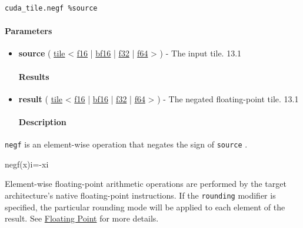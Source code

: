 \documentclass{article}
\begin{document}
\begin{lstlisting}
cuda_tile.negf %source
\end{lstlisting}

\paragraph{Parameters}

\begin{itemize}
\item \textbf{source} ( \href{https://docs.nvidia.com/cuda/tile-ir/latest/sections/types.html#type-tile}{tile} < \href{https://docs.nvidia.com/cuda/tile-ir/latest/sections/types.html#subsection-element-types}{f16} | \href{https://docs.nvidia.com/cuda/tile-ir/latest/sections/types.html#subsection-element-types}{bf16} | \href{https://docs.nvidia.com/cuda/tile-ir/latest/sections/types.html#subsection-element-types}{f32} | \href{https://docs.nvidia.com/cuda/tile-ir/latest/sections/types.html#subsection-element-types}{f64} > ) - The input tile. 13.1


\paragraph{Results}

\item \textbf{result} ( \href{https://docs.nvidia.com/cuda/tile-ir/latest/sections/types.html#type-tile}{tile} < \href{https://docs.nvidia.com/cuda/tile-ir/latest/sections/types.html#subsection-element-types}{f16} | \href{https://docs.nvidia.com/cuda/tile-ir/latest/sections/types.html#subsection-element-types}{bf16} | \href{https://docs.nvidia.com/cuda/tile-ir/latest/sections/types.html#subsection-element-types}{f32} | \href{https://docs.nvidia.com/cuda/tile-ir/latest/sections/types.html#subsection-element-types}{f64} > ) - The negated floating-point tile. 13.1


\paragraph{Description}

\end{itemize}
\texttt{negf} is an element-wise operation that negates the sign of \texttt{source} .


negf(x)i=-xi

Element-wise floating-point arithmetic operations are performed by the target architecture's native floating-point instructions. If the \texttt{rounding} modifier is specified, the particular rounding mode will be applied to each element of the result. See \href{https://docs.nvidia.com/cuda/tile-ir/latest/sections/operations.html#op-group-floating-point}{Floating Point} for more details.
\end{document}

